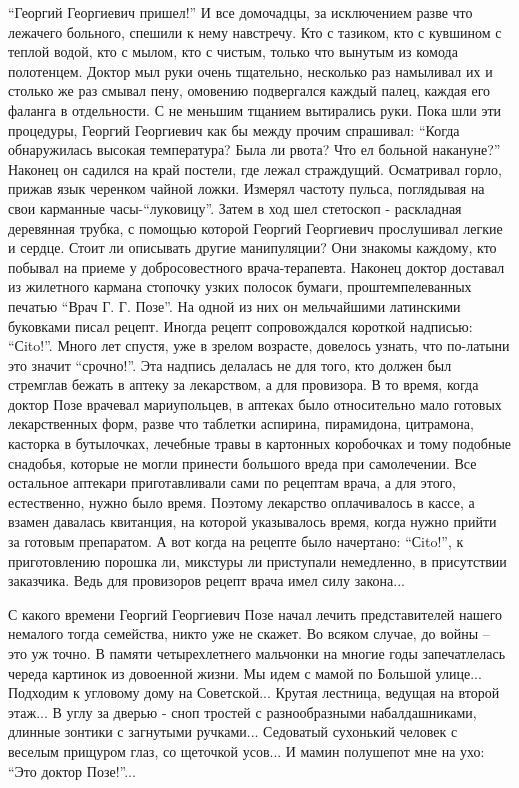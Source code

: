 \enquote{Георгий Георгиевич пришел!} И все домочадцы, за исключением разве что лежачего
больного, спешили к нему навстречу. Кто с тазиком, кто с кувшином с теплой
водой, кто с мылом, кто с чистым, только что вынутым из комода полотенцем.
Доктор мыл руки очень тщательно, несколько раз намыливал их и столько же раз
смывал пену, омовению подвергался каждый палец, каждая его фаланга в
отдельности. С не меньшим тщанием вытирались руки. Пока шли эти процедуры,
Георгий Георгиевич как бы между прочим спрашивал: \enquote{Когда  обнаружилась высокая
температура? Была ли рвота? Что ел больной накануне?} Наконец он садился на
край постели, где лежал страждущий. Осматривал горло, прижав язык черенком
чайной ложки. Измерял частоту пульса, поглядывая на свои карманные
часы-\enquote{луковицу}. Затем в ход шел стетоскоп - раскладная деревянная трубка, с
помощью которой  Георгий Георгиевич прослушивал легкие и сердце. Стоит ли
описывать другие манипуляции?  Они знакомы каждому, кто побывал на приеме у
добросовестного врача-терапевта. Наконец доктор доставал из жилетного кармана
стопочку узких полосок бумаги, проштемпелеванных печатью \enquote{Врач Г. Г. Позе}. На
одной из них он мельчайшими латинскими буковками писал рецепт. Иногда рецепт
сопровождался короткой надписью: \enquote{Сito!}. Много лет спустя, уже в зрелом
возрасте, довелось узнать, что по-латыни это значит \enquote{срочно!}. Эта надпись
делалась не для того, кто должен был стремглав бежать в аптеку за лекарством, а
для провизора. В то время, когда доктор Позе врачевал мариупольцев, в аптеках
было относительно мало готовых лекарственных форм, разве что таблетки аспирина,
пирамидона, цитрамона, касторка в бутылочках, лечебные травы в картонных
коробочках и тому подобные снадобья, которые не могли принести большого вреда
при самолечении. Все остальное аптекари приготавливали сами по рецептам врача,
а для этого, естественно, нужно было время. Поэтому лекарство оплачивалось в
кассе, а взамен давалась квитанция, на которой указывалось время, когда нужно
прийти за готовым препаратом. А вот когда на рецепте было начертано: \enquote{Сito!}, к
приготовлению порошка ли, микстуры ли приступали немедленно,  в присутствии
заказчика. Ведь для провизоров рецепт врача имел силу закона...  

С какого времени Георгий Георгиевич Позе начал лечить представителей нашего
немалого тогда семейства, никто уже не скажет. Во всяком  случае, до войны –
это уж точно. В памяти четырехлетнего мальчонки  на многие годы запечатлелась
череда картинок из довоенной жизни. Мы идем с мамой по Большой улице... Подходим
к угловому дому на Советской... Крутая лестница, ведущая на второй этаж...  В углу
за дверью - сноп тростей с разнообразными набалдашниками, длинные зонтики с
загнутыми ручками... Седоватый сухонький человек с веселым прищуром глаз, со
щеточкой усов... И мамин полушепот мне на ухо: \enquote{Это доктор Позе!}...

